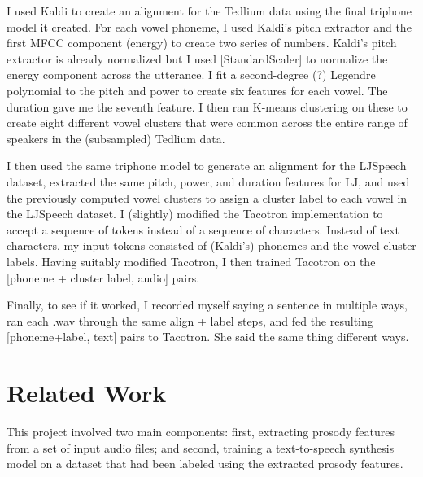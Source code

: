 \documentclass{article}
\begin{document}
I used Kaldi \cite{Povey_ASRU2011} to create an alignment for the Tedlium data using the final triphone model it created. For each vowel phoneme, I used Kaldi's pitch extractor and the first MFCC component (energy) to create two series of numbers. Kaldi's pitch extractor is already normalized but I used [StandardScaler] to normalize the energy component across the utterance. I fit a second-degree (?) Legendre polynomial to the pitch and power to create six features for each vowel. The duration gave me the seventh feature. I then ran K-means clustering on these to create eight different vowel clusters that were common across the entire range of speakers in the (subsampled) Tedlium data.

I then used the same triphone model to generate an alignment for the LJSpeech dataset, extracted the same pitch, power, and duration features for LJ, and used the previously computed vowel clusters to assign a cluster label to each vowel in the LJSpeech dataset. I (slightly) modified the Tacotron implementation to accept a sequence of tokens instead of a sequence of characters. Instead of text characters, my input tokens consisted of (Kaldi's) phonemes and the vowel cluster labels. Having suitably modified Tacotron, I then trained Tacotron on the [phoneme + cluster label, audio] pairs.

Finally, to see if it worked, I recorded myself saying a sentence in multiple ways, ran each .wav through the same align + label steps, and fed the resulting [phoneme+label, text] pairs to Tacotron. She said the same thing different ways.

\section{Related Work}
\label{sec:sota}

This project involved two main components: first, extracting prosody features from a set of input audio files; and second, training a text-to-speech synthesis model on a dataset that had been labeled using the extracted prosody features.
\end{document}
